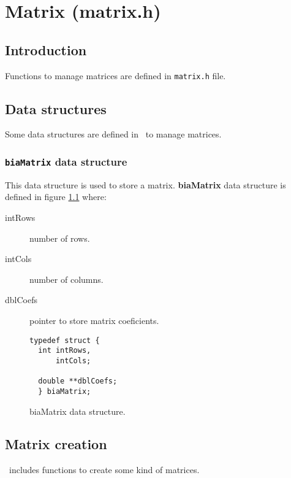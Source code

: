 %
%

\chapter{Matrix (matrix.h)}

\section{Introduction}

Functions to manage matrices are defined in \texttt{matrix.h} file.\\

\section{Data structures}

Some data structures are defined in \BI \ to manage matrices.

\subsection{\texttt{biaMatrix} data structure} \label{sec:biaMatrix}

This data structure is used to store a matrix. \textbf{biaMatrix} data structure is defined in figure \ref{fig:biaMatrix} where:

\begin{description}
\item[intRows] number of rows.
\item[intCols] number of columns.
\item[dblCoefs] pointer to store matrix coeficients.
\end{description}

\begin{figure}[!h]
\begin{verbatim}
typedef struct {
  int intRows,
      intCols;

  double **dblCoefs;
  } biaMatrix;   
\end{verbatim}
\caption{biaMatrix data structure.} \label{fig:biaMatrix}
\end{figure}

\FloatBarrier

\section{Matrix creation}

\BI \ includes functions to create some kind of matrices.

